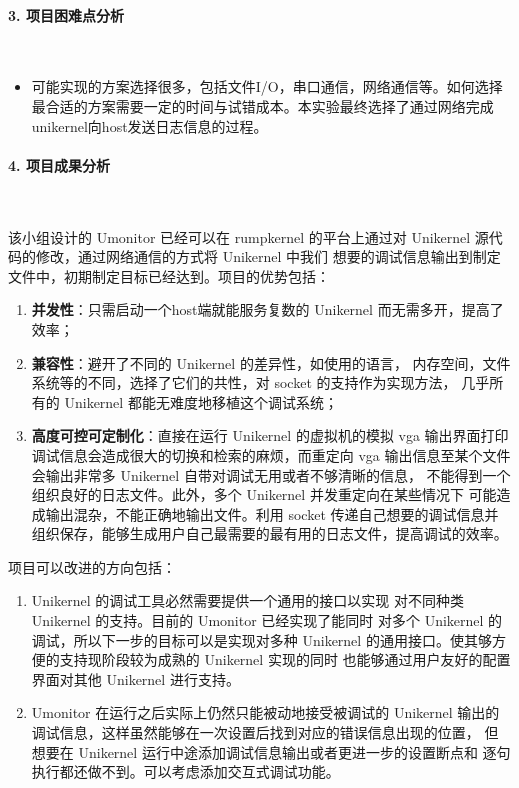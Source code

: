 \documentclass[UTF8,fontset=none,linespread=1.15]{ctexart}
\begin{document}
\paragraph{3. 项目困难点分析}~\par
\begin{itemize}
\item 可能实现的方案选择很多，包括文件I/O，串口通信，网络通信等。如何选择最合适的方案需要一定的时间与试错成本。本实验最终选择了通过网络完成unikernel向host发送日志信息的过程。
\end{itemize}

\paragraph{4. 项目成果分析}~\par

该小组设计的 Umonitor 已经可以在 rumpkernel 的平台上通过对
Unikernel 源代码的修改，通过网络通信的方式将 Unikernel 中我们
想要的调试信息输出到制定文件中，初期制定目标已经达到。项目的优势包括：

\begin{enumerate}
\item  \textbf{并发性}：只需启动一个host端就能服务复数的
Unikernel 而无需多开，提高了效率；
\item \textbf{兼容性}：避开了不同的 Unikernel 的差异性，如使用的语言，
内存空间，文件系统等的不同，选择了它们的共性，对 socket 的支持作为实现方法，
几乎所有的 Unikernel 都能无难度地移植这个调试系统；
\item \textbf{高度可控可定制化}：直接在运行 Unikernel 的虚拟机的模拟
vga 输出界面打印调试信息会造成很大的切换和检索的麻烦，而重定向 vga
输出信息至某个文件会输出非常多 Unikernel 自带对调试无用或者不够清晰的信息，
不能得到一个组织良好的日志文件。此外，多个 Unikernel 并发重定向在某些情况下
可能造成输出混杂，不能正确地输出文件。利用 socket 传递自己想要的调试信息并
组织保存，能够生成用户自己最需要的最有用的日志文件，提高调试的效率。
\end{enumerate}

项目可以改进的方向包括：
\begin{enumerate}
\item Unikernel 的调试工具必然需要提供一个通用的接口以实现
对不同种类 Unikernel 的支持。目前的 Umonitor 已经实现了能同时
对多个 Unikernel 的调试，所以下一步的目标可以是实现对多种 Unikernel 的通用接口。使其够方便的支持现阶段较为成熟的 Unikernel 实现的同时
也能够通过用户友好的配置界面对其他 Unikernel 进行支持。
\item Umonitor 在运行之后实际上仍然只能被动地接受被调试的 Unikernel
输出的调试信息，这样虽然能够在一次设置后找到对应的错误信息出现的位置，
但想要在 Unikernel 运行中途添加调试信息输出或者更进一步的设置断点和
逐句执行都还做不到。可以考虑添加交互式调试功能。
\end{enumerate}
\end{document}
